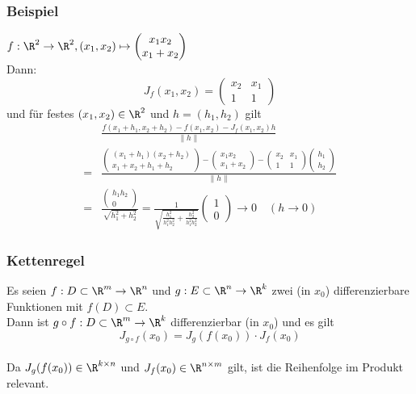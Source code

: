 \begin{frame}\frametitle{Beispiel}
$f: \R^2 \to \R^2, (x_1,x_2) \mapsto \begin{pmatrix}x_1x_2 \\ x_1+x_2 \end{pmatrix}$\\
Dann:
$$
J_f(x_1,x_2)= \begin{pmatrix} x_2& x_1 \\ 1 & 1 \end{pmatrix}
$$\pause
und für festes $(x_1,x_2) \in \R^2$ und $h=(h_1,h_2)$ gilt
\begin{align*}
&\frac{f(x_1+h_1,x_2+h_2)-f(x_1,x_2)-J_f(x_1,x_2)h}{\|h\|}\\
=&\frac{\begin{pmatrix} (x_1+h_1)(x_2+h_2) \\ x_1+x_2+h_1+h_2 \end{pmatrix}- \begin{pmatrix} x_1 x_2 \\ x_1+x_2 \end{pmatrix}-\begin{pmatrix} x_2& x_1 \\ 1 & 1 \end{pmatrix} \begin{pmatrix} h_1 \\ h_2 \end{pmatrix}}{\|h\|}\\
=&\frac{\begin{pmatrix}h_1h_2\\ 0 \end{pmatrix}}{\sqrt{h_1^2+h_2^2}}=\frac{1}{\sqrt{\frac{h_1^2}{h_1^2h_2^2}+\frac{h_2^2}{h_1^2h_2^2}}}\begin{pmatrix}1\\ 0 \end{pmatrix} \to 0 \quad (h \to 0)
\end{align*}
	
\end{frame}
%
%
\begin{frame}\frametitle{Kettenregel}
Es seien $f: D \subset \R^m \to \R^n$ und $g: E \subset \R^n \to \R^k$ zwei (in $x_0$) differenzierbare Funktionen mit $f(D) \subset E$. \\
Dann ist $g\circ f : D \subset \R^m \to \R^k$ differenzierbar (in $x_0$) und es gilt
$$
J_{g \circ f}(x_0)= J_g(f(x_0))\cdot J_f(x_0)
$$
\vfill \pause
{}\\ Da $J_g(f(x_0)) \in \R^{k \times n}$ und $J_f(x_0) \in \R^{n \times m}$ gilt, ist die Reihenfolge im Produkt relevant.
\end{frame}
